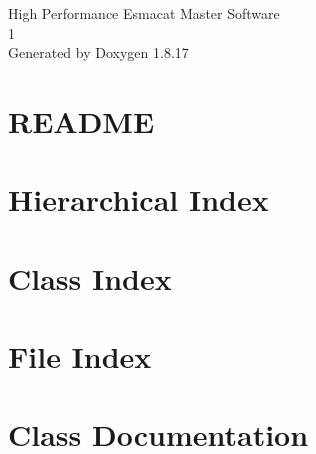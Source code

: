 \let\mypdfximage\pdfximage\def\pdfximage{\immediate\mypdfximage}\documentclass[twoside]{book}
\newcommand{\+}{\discretionary{\mbox{\scriptsize$\hookleftarrow$}}{}{}}
\newcommand{\clearemptydoublepage}{%
  \newpage{\pagestyle{empty}\cleardoublepage}%
}
\begin{document}
\hypersetup{pageanchor=false,
             bookmarksnumbered=true,
             pdfencoding=unicode
            }
\begin{titlepage}
\vspace*{7cm}
\begin{center}%
{\Large High Performance Esmacat Master Software \\[1ex]\large 1 }\\
\vspace*{1cm}
{\large Generated by Doxygen 1.8.17}\\
\end{center}
\end{titlepage}
\clearemptydoublepage
{}
\tableofcontents
\clearemptydoublepage
{}
\hypersetup{pageanchor=true}

\chapter{R\+E\+A\+D\+ME}
\label{md_esmacat-slave-drivers_README}

\chapter{Hierarchical Index}

\chapter{Class Index}

\chapter{File Index}

\chapter{Class Documentation}













\end{document}
